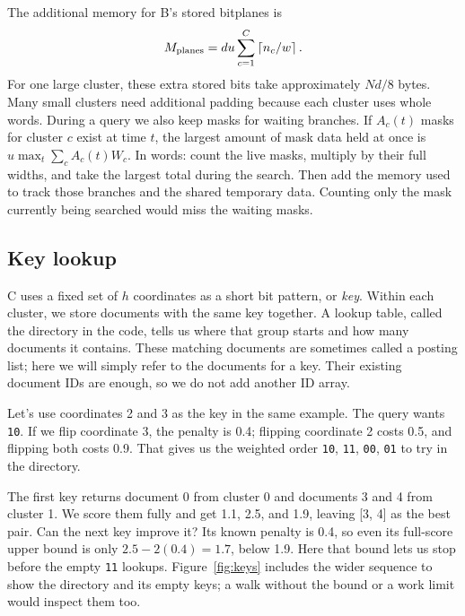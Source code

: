 The additional memory for B's stored bitplanes is
\begin{equation}
M_{\rm planes}=du\sum_{c=1}^{C}\left\lceil n_c/w\right\rceil.
\label{eq:planes}
\end{equation}
For one large cluster, these extra stored bits take approximately $Nd/8$ bytes. Many small
clusters need additional padding because each cluster uses whole words. During a query we
also keep masks for waiting branches. If $A_c(t)$ masks for cluster $c$ exist at time $t$,
the largest amount of mask data held at once is $u\max_t\sum_c A_c(t)W_c$. In words: count
the live masks, multiply by their full widths, and take the largest total during the search.
Then add the memory used to track those branches and the shared temporary data. Counting only
the mask currently being searched would miss the waiting masks.

\subsection{Key lookup}
C uses a fixed set of $h$ coordinates as a short bit pattern, or \emph{key}. Within each
cluster, we store documents with the same key together. A lookup table, called the directory
in the code, tells us where that group starts and how many documents it contains. These
matching documents are sometimes called a posting list; here we will simply refer to the
documents for a key. Their existing document IDs are enough, so we do not add another ID array.

Let's use coordinates 2 and 3 as the key in the same example. The query wants \texttt{10}.
If we flip coordinate 3, the penalty is 0.4; flipping coordinate 2 costs 0.5, and flipping
both costs 0.9. That gives us the weighted order \texttt{10}, \texttt{11}, \texttt{00},
\texttt{01} to try in the directory.


The first key returns document 0 from cluster 0 and documents 3 and 4 from cluster 1. We
score them fully and get 1.1, 2.5, and 1.9, leaving [3, 4] as the best pair. Can the next key
improve it? Its known penalty is 0.4, so even its full-score upper bound is only
$2.5-2(0.4)=1.7$, below 1.9. Here that bound lets us stop before the empty \texttt{11}
lookups. Figure~\ref{fig:keys} includes the wider sequence to show the directory and its empty
keys; a walk without the bound or a work limit would inspect them too.

